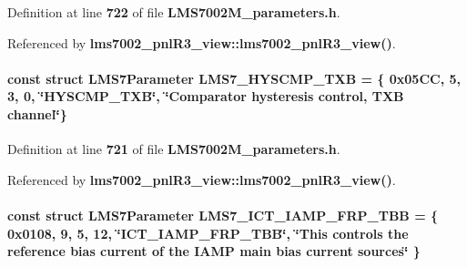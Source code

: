 Definition at line {\bf 722} of file {\bf L\+M\+S7002\+M\+\_\+parameters.\+h}.



Referenced by {\bf lms7002\+\_\+pnl\+R3\+\_\+view\+::lms7002\+\_\+pnl\+R3\+\_\+view()}.

\paragraph[{L\+M\+S7\+\_\+\+H\+Y\+S\+C\+M\+P\+\_\+\+T\+XB}]{\setlength{\rightskip}{0pt plus 5cm}const struct {\bf L\+M\+S7\+Parameter} L\+M\+S7\+\_\+\+H\+Y\+S\+C\+M\+P\+\_\+\+T\+XB = \{ 0x05\+C\+C, 5, 3, 0, \char`\"{}\+H\+Y\+S\+C\+M\+P\+\_\+\+T\+X\+B\char`\"{}, \char`\"{}\+Comparator hysteresis control, T\+X\+B channel\char`\"{}\}\hspace{0.3cm}{\ttfamily [static]}}\label{LMS7002M__parameters_8h_af1252edf5a06566df4137f33c0534cc7}


Definition at line {\bf 721} of file {\bf L\+M\+S7002\+M\+\_\+parameters.\+h}.



Referenced by {\bf lms7002\+\_\+pnl\+R3\+\_\+view\+::lms7002\+\_\+pnl\+R3\+\_\+view()}.

\paragraph[{L\+M\+S7\+\_\+\+I\+C\+T\+\_\+\+I\+A\+M\+P\+\_\+\+F\+R\+P\+\_\+\+T\+BB}]{\setlength{\rightskip}{0pt plus 5cm}const struct {\bf L\+M\+S7\+Parameter} L\+M\+S7\+\_\+\+I\+C\+T\+\_\+\+I\+A\+M\+P\+\_\+\+F\+R\+P\+\_\+\+T\+BB = \{ 0x0108, 9, 5, 12, \char`\"{}\+I\+C\+T\+\_\+\+I\+A\+M\+P\+\_\+\+F\+R\+P\+\_\+\+T\+B\+B\char`\"{}, \char`\"{}\+This controls the reference bias current of the I\+A\+M\+P main bias current sources\char`\"{} \}\hspace{0.3cm}{\ttfamily [static]}}\label{LMS7002M__parameters_8h_a69129ef40919ffe9c08d04057b54032a}


